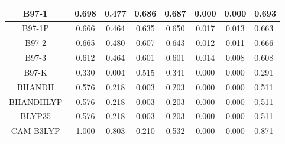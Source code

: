 \begin{tabular}{|c|c|c|c|c|c|c|l|}
                                  B97-1~\cite{Hamprecht1998_6264} &                0.698 &                          0.477 &             0.686 &                        0.687 &                0.000 &                0.000 &                       0.693 \\ \hline
                                      B97-1P~\cite{Cohen2000_160} &                0.666 &                          0.464 &             0.635 &                        0.650 &                0.017 &                0.013 &                       0.663 \\ \hline
                                     B97-2~\cite{Wilson2001_9233} &                0.665 &                          0.480 &             0.607 &                        0.643 &                0.012 &                0.011 &                       0.666 \\ \hline
                                     B97-3~\cite{Keal2005_121103} &                0.612 &                          0.464 &             0.601 &                        0.601 &                0.014 &                0.008 &                       0.608 \\ \hline
                                      B97-K~\cite{Boese2004_3405} &                0.330 &                          0.004 &             0.515 &                        0.341 &                0.000 &                0.000 &                       0.291 \\ \hline
              BHANDH~\cite{Becke1993_1372,gaussianimplementation} &                0.576 &                          0.218 &             0.003 &                        0.203 &                0.000 &                0.000 &                       0.511 \\ \hline
           BHANDHLYP~\cite{Becke1993_1372,gaussianimplementation} &                0.576 &                          0.218 &             0.003 &                        0.203 &                0.000 &                0.000 &                       0.511 \\ \hline
                     BLYP35~\cite{Renz2009_16292,Kaupp2011_16973} &                0.576 &                          0.218 &             0.003 &                        0.203 &                0.000 &                0.000 &                       0.511 \\ \hline
                                    CAM-B3LYP~\cite{Yanai2004_51} &                1.000 &                          0.803 &             0.210 &                        0.532 &                0.000 &                0.000 &                       0.871 \\ \hline

\end{tabular}
